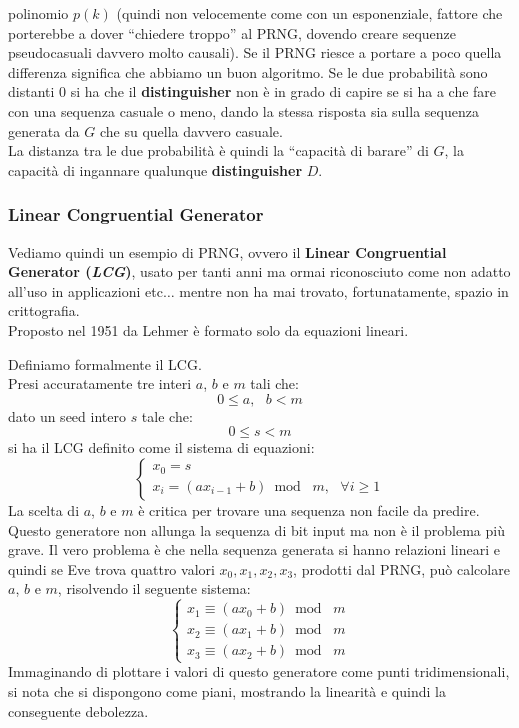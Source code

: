 \documentclass[a4paper,12pt, oneside]{book}
\begin{document}
\begin{definizione}
  polinomio $p(k)$ (quindi non velocemente come con un esponenziale, fattore che
  porterebbe a dover ``chiedere troppo'' al PRNG, dovendo creare sequenze
  pseudocasuali davvero molto causali). Se il PRNG riesce a portare a poco
  quella differenza significa che abbiamo un buon algoritmo. Se le due
  probabilità sono distanti 0 si ha che il \textbf{distinguisher} non è in grado
  di capire se si ha a che fare con una sequenza casuale o meno, dando la stessa
  risposta sia sulla sequenza generata da $G$ che su quella davvero casuale.\\
  La distanza tra le due probabilità è quindi la ``capacità di barare'' di $G$,
  la capacità di ingannare qualunque \textbf{distinguisher} $D$.
\end{definizione}
\subsubsection{Linear Congruential Generator}
Vediamo quindi un esempio di PRNG, ovvero il \textbf{Linear Congruential
  Generator (\textit{LCG})}, usato per tanti anni ma ormai riconosciuto come non
 adatto all'uso in applicazioni etc$\ldots$ mentre non ha mai trovato,
 fortunatamente, spazio in crittografia. \\
Proposto nel 1951 da Lehmer è formato solo da equazioni lineari.
\begin{definizione}
  Definiamo formalmente il LCG.\\
  Presi accuratamente tre interi $a$, $b$ e $m$ tali che:
  \[0\leq a,\,\,\,\,b< m\]
  dato un seed intero $s$ tale che:
  \[0\leq s< m\]
  si ha il LCG definito come il sistema di equazioni:
  \[
    \begin{cases}
      x_0=s\\
      x_i=(ax_{i-1}+b)\bmod\,\,m,\,\,\,\,\forall i\geq 1
    \end{cases}
  \]
   La scelta di $a$, $b$ e $m$ è critica per trovare una sequenza non facile da
  predire. \\
  Questo generatore non allunga la sequenza di bit input ma non è il problema
  più grave. Il vero problema è che nella sequenza generata si hanno relazioni
  lineari e quindi se Eve trova quattro valori $x_0,x_1,x_2, x_3$, prodotti dal
  PRNG, può calcolare $a$, $b$ e $m$, risolvendo il seguente sistema:
  \[
    \begin{cases}
      x_1\equiv(ax_{0}+b)\bmod\,\,m\\
      x_2\equiv(ax_{1}+b)\bmod\,\,m\\
      x_3\equiv(ax_{2}+b)\bmod\,\,m
    \end{cases}
  \]
  Immaginando di plottare i valori di questo generatore come punti
  tridimensionali, si nota che si dispongono come piani, mostrando la linearità
  e quindi la conseguente debolezza. 
\end{definizione}
\end{document}
